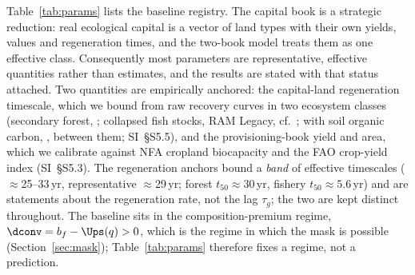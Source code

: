 Table~\ref{tab:params} lists the baseline registry. The capital book is a strategic reduction: real ecological capital is a vector of land types with their own yields, values and regeneration times, and the two-book model treats them as one effective class. Consequently most parameters are representative, effective quantities rather than estimates, and the results are stated with that status attached. Two quantities are empirically anchored: the capital-land regeneration timescale, which we bound from raw recovery curves in two ecosystem classes (secondary forest, \citealp{Poorter2016}; collapsed fish stocks, RAM Legacy, cf.\ \citealp{HutchingsReynolds2004,Neubauer2013}; with soil organic carbon, \citealp{Poeplau2011}, between them; SI~\S S5.5), and the provisioning-book yield and area, which we calibrate against NFA cropland biocapacity and the FAO crop-yield index (SI~\S S5.3). The regeneration anchors bound a \emph{band} of effective timescales ($\approx$25--33\,yr, representative $\approx$29\,yr; forest $t_{50}\approx30$\,yr, fishery $t_{50}\approx5.6$\,yr) and are statements about the regeneration rate, not the lag $\tau_g$; the two are kept distinct throughout. The baseline sits in the composition-premium regime, $\dconv=b_f-\Ups(q)>0$, which is the regime in which the mask is possible (Section~\ref{sec:mask}); Table~\ref{tab:params} therefore fixes a regime, not a prediction.

